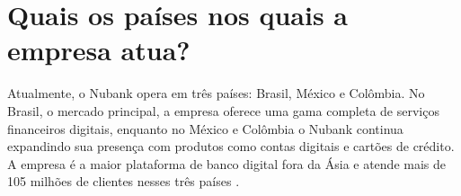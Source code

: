 \section{Quais os países nos quais a empresa atua?}

Atualmente, o Nubank opera em três países: Brasil, México e Colômbia. No Brasil, o mercado principal, a empresa oferece uma gama completa de serviços financeiros digitais, enquanto no México e Colômbia o Nubank continua expandindo sua presença com produtos como contas digitais e cartões de crédito. A empresa é a maior plataforma de banco digital fora da Ásia e atende mais de 105 milhões de clientes nesses três países \cite{nubank2024international}.